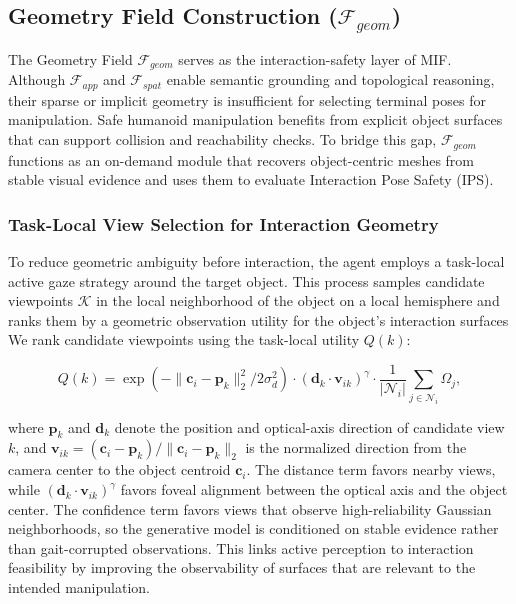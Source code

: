 \documentclass[conference]{IEEEtran}
\begin{document}
\subsection{Geometry Field Construction ($\mathcal{F}_{geom}$)}
\label{sec:geometry_field}
%
The Geometry Field $\mathcal{F}_{geom}$ serves as the interaction-safety layer of MIF.
%
Although $\mathcal{F}_{app}$ and $\mathcal{F}_{spat}$ enable semantic grounding and topological reasoning, their sparse or implicit geometry is insufficient for selecting terminal poses for manipulation.
%
Safe humanoid manipulation benefits from explicit object surfaces that can support collision and reachability checks.
%
To bridge this gap, $\mathcal{F}_{geom}$ functions as an on-demand module that recovers object-centric meshes from stable visual evidence and uses them to evaluate Interaction Pose Safety (IPS).

\subsubsection{Task-Local View Selection for Interaction Geometry}
%
To reduce geometric ambiguity before interaction, the agent employs a task-local active gaze strategy around the target object.
%
This process samples candidate viewpoints $\mathcal{K}$ in the local neighborhood of the object on a local hemisphere and ranks them by a geometric observation utility for the object's interaction surfaces
%
We rank candidate viewpoints using the task-local utility $Q(k)$:

\begin{equation}
    Q(k) = \exp( -\| \mathbf{c}_i - \mathbf{p}_k \|_2^2 / 2\sigma_d^2 ) \cdot (\mathbf{d}_k \cdot \mathbf{v}_{ik})^\gamma \cdot \frac{1}{|\mathcal{N}_i|} \sum_{j \in \mathcal{N}_i} \Omega_j, \label{eq:qk}
\end{equation}

where $\mathbf{p}_k$ and $\mathbf{d}_k$ denote the position and optical-axis direction of candidate view $k$, and $\mathbf{v}_{ik} = (\mathbf{c}_i - \mathbf{p}_k) / \|\mathbf{c}_i - \mathbf{p}_k\|_2$ is the normalized direction from the camera center to the object centroid $\mathbf{c}_i$.
%
The distance term favors nearby views, while $(\mathbf{d}_k \cdot \mathbf{v}_{ik})^\gamma$ favors foveal alignment between the optical axis and the object center.
%
The confidence term favors views that observe high-reliability Gaussian neighborhoods, so the generative model is conditioned on stable evidence rather than gait-corrupted observations.
%
This links active perception to interaction feasibility by improving the observability of surfaces that are relevant to the intended manipulation.
\end{document}
